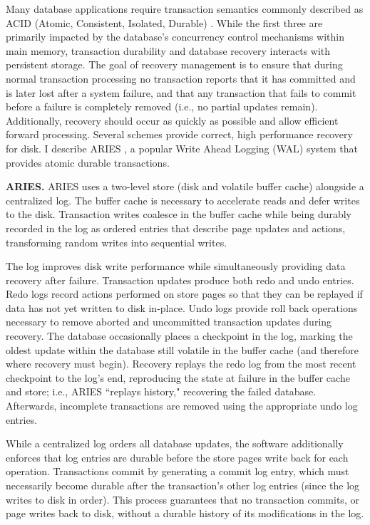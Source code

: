 Many database applications require transaction semantics commonly described as ACID (Atomic, Consistent, Isolated, Durable) \cite{Gray81}.
While the first three are primarily impacted by the database's concurrency control mechanisms within main memory, transaction durability and database recovery interacts with persistent storage.
The goal of recovery management is to ensure that during normal transaction processing no transaction reports that it has committed and is later lost after a system failure, and that any transaction that fails to commit before a failure is completely removed (i.e., no partial updates remain).
Additionally, recovery should occur as quickly as possible and allow efficient forward processing.
Several schemes provide correct, high performance recovery for disk.
I describe ARIES \cite{MohanHaderle92}, a popular Write Ahead Logging (WAL) system that provides atomic durable transactions.

\textbf{ARIES.}
ARIES uses a two-level store (disk and volatile buffer cache) alongside a centralized log.
The buffer cache is necessary to accelerate reads and defer writes to the disk.
Transaction writes coalesce in the buffer cache while being durably recorded in the log as ordered entries that describe page updates and actions, transforming random writes into sequential writes.

The log improves disk write performance while simultaneously providing data recovery after failure.
Transaction updates produce both redo and undo entries.
Redo logs record actions performed on store pages so that they can be replayed if data has not yet written to disk in-place.
Undo logs provide roll back operations necessary to remove aborted and uncommitted transaction updates during recovery.
The database occasionally places a checkpoint in the log, marking the oldest update within the database still volatile in the buffer cache (and therefore where recovery must begin).
Recovery replays the redo log from the most recent checkpoint to the log's end, reproducing the state at failure in the buffer cache and store; i.e., ARIES ``replays history," recovering the failed database.
Afterwards, incomplete transactions are removed using the appropriate undo log entries.

While a centralized log orders all database updates, the software additionally enforces that log entries are durable before the store pages write back for each operation.
Transactions commit by generating a commit log entry, which must necessarily become durable after the transaction's other log entries (since the log writes to disk in order).
This process guarantees that no transaction commits, or page writes back to disk, without a durable history of its modifications in the log.

